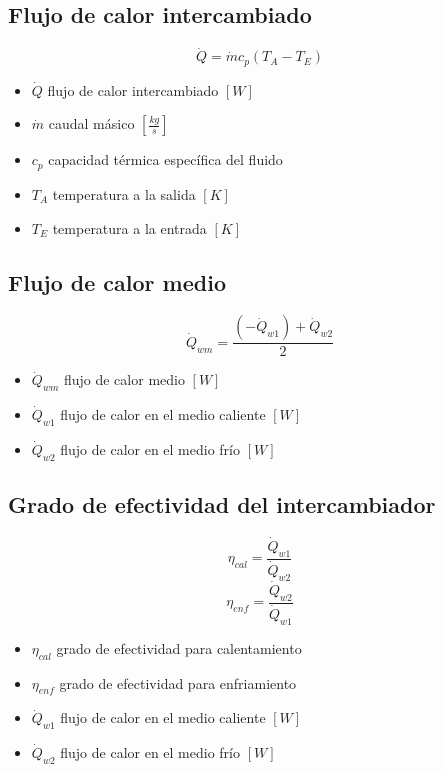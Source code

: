 \documentclass[letterpaper,11pt]{article} %
\begin{document}
\subsection{Flujo de calor intercambiado}
\begin{equation}
\dot{Q} = \dot{m}c_p (T_{A}-T_{E})
\end{equation}
\begin{itemize}
	\item $\dot{Q}$ flujo de calor intercambiado $[W]$
	\item $\dot{m}$ caudal másico $[\frac{kg}{s}]$
	\item $c_p$ capacidad térmica específica del fluido 
	\item $T_{A}$ temperatura a la salida $[K]$
	\item $T_{E}$ temperatura a la entrada $[K]$ 
\end{itemize}
\subsection{Flujo de calor medio}
\begin{equation}
\dot{Q}_{wm} = \frac{(-\dot{Q}_{w1}) + \dot{Q}_{w2}}{2}
\end{equation} 
\begin{itemize}
	\item $\dot{Q}_{wm}$ flujo de calor medio $[W]$
	\item $\dot{Q}_{w1}$ flujo de calor en el medio caliente $[W]$
	\item $\dot{Q}_{w2}$ flujo de calor en el medio frío $[W]$
\end{itemize}
\subsection{Grado de efectividad del intercambiador}
\begin{equation}
\eta_{cal} = \frac{\dot{Q}_{w1}}{\dot{Q}_{w2}}
\end{equation} 
\begin{equation}
\eta_{enf} = \frac{\dot{Q}_{w2}}{\dot{Q}_{w1}}
\end{equation}
\begin{itemize}
	\item $\eta_{cal}$ grado de efectividad para calentamiento
	\item $\eta_{enf}$ grado de efectividad para enfriamiento
	\item $\dot{Q}_{w1}$ flujo de calor en el medio caliente $[W]$
	\item $\dot{Q}_{w2}$ flujo de calor en el medio frío $[W]$
\end{itemize}
\end{document}

